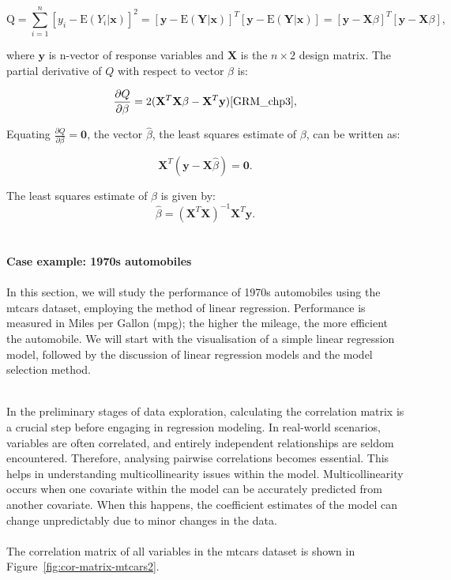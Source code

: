 \documentclass{article}\usepackage[]{graphicx}\usepackage[]{xcolor}
\begin{document}
\begin{equation*}
\mathrm{Q} = \sum_{i=1}^{n} [y_i - \mathrm{E} (Y_i | \mathbf{x})]^2 
           = [\mathbf{y}- \mathrm{E} (\mathbf{Y} | \mathbf{x})]^{T} [\mathbf{y}- \mathrm{E} (\mathbf{Y} | \mathbf{x})] 
           = [\mathbf{y}- \mathbf{X} \beta]^{T} [\mathbf{y}- \mathbf{X} \beta],
\end{equation*}

\noindent
where $\mathbf{y}$ is n-vector of response variables and $\mathbf{X}$ is the $n \times 2$ design matrix. The partial derivative of $Q$ with respect to vector $\beta$ is:

$$\frac{\partial Q}{\partial \beta} = 2(\mathbf{X}^T\mathbf{X}\beta - \mathbf{X}^T\mathbf{y})\cite{GRM_chp3},$$

\noindent
Equating $\frac{\partial Q}{\partial \beta} = \mathbf{0}$, the vector $\hat{\beta}$, the least squares estimate of $\beta$, can be written as:

$$\mathbf{X}^T(\mathbf{y}-\mathbf{X}\hat{\beta})=\mathbf{0}.$$

\noindent 
The least squares estimate of $\beta$ is given by:
$$\hat{\beta} = (\mathbf{X}^T\mathbf{X})^{-1}\mathbf{X}^T\mathbf{y}.$$
\\  
\noident 
\\\textbf{Case example: 1970s automobiles}\\
\noindent
\\In this section, we will study the performance of 1970s automobiles using the mtcars dataset, employing the method of linear regression. Performance is measured in Miles per Gallon (mpg); the higher the mileage, the more efficient the automobile. We will start with the visualisation of a simple linear regression model, followed by the discussion of linear regression models and the model selection method.

\noindent
\\In the preliminary stages of data exploration, calculating the correlation matrix is a crucial step before engaging in regression modeling. In real-world scenarios, variables are often correlated, and entirely independent relationships are seldom encountered. Therefore, analysing pairwise correlations becomes essential. This helps in understanding multicollinearity issues within the model. Multicollinearity occurs when one covariate within the model can be accurately predicted from another covariate. When this happens, the coefficient estimates of the model can change unpredictably due to minor changes in the data.\\
\noindent
\\The correlation matrix of all variables in the mtcars dataset is shown in Figure~\ref{fig:cor-matrix-mtcars2}.
\end{document}
